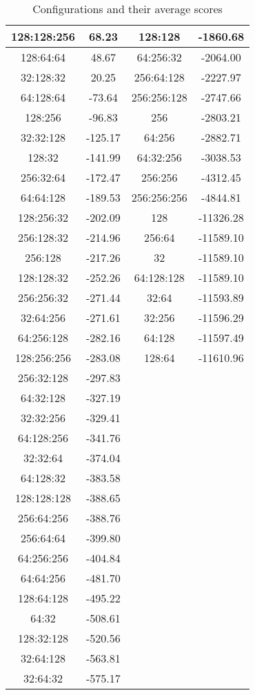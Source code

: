 \begin{table}[h]
\begin{tabular}{|c|c||c|c|}
\hline
128:128:256 & 68.23 & 128:128 & -1860.68 \\
\hline
128:64:64 & 48.67 & 64:256:32 & -2064.00 \\
\hline
32:128:32 & 20.25 & 256:64:128 & -2227.97 \\
\hline
64:128:64 & -73.64 & 256:256:128 & -2747.66 \\
\hline
128:256 & -96.83 & 256 & -2803.21 \\
\hline
32:32:128 & -125.17 & 64:256 & -2882.71 \\
\hline
128:32 & -141.99 & 64:32:256 & -3038.53 \\
\hline
256:32:64 & -172.47 & 256:256 & -4312.45 \\
\hline
64:64:128 & -189.53 & 256:256:256 & -4844.81 \\
\hline
128:256:32 & -202.09 & 128 & -11326.28 \\
\hline
256:128:32 & -214.96 & 256:64 & -11589.10 \\
\hline
256:128 & -217.26 & 32 & -11589.10 \\
\hline
128:128:32 & -252.26 & 64:128:128 & -11589.10 \\
\hline
256:256:32 & -271.44 & 32:64 & -11593.89 \\
\hline
32:64:256 & -271.61 & 32:256 & -11596.29 \\
\hline
64:256:128 & -282.16 & 64:128 & -11597.49 \\
\hline
128:256:256 & -283.08 & 128:64 & -11610.96 \\
\hline
256:32:128 & -297.83 &  &  \\
\hline
64:32:128 & -327.19 &  &  \\
\hline
32:32:256 & -329.41 &  &  \\
\hline
64:128:256 & -341.76 &  &  \\
\hline
32:32:64 & -374.04 &  &  \\
\hline
64:128:32 & -383.58 &  &  \\
\hline
128:128:128 & -388.65 &  &  \\
\hline
256:64:256 & -388.76 &  &  \\
\hline
256:64:64 & -399.80 &  &  \\
\hline
64:256:256 & -404.84 &  &  \\
\hline
64:64:256 & -481.70 &  &  \\
\hline
128:64:128 & -495.22 &  &  \\
\hline
64:32 & -508.61 &  &  \\
\hline
128:32:128 & -520.56 &  &  \\
\hline
32:64:128 & -563.81 &  &  \\
\hline
32:64:32 & -575.17 &  &  \\
\hline
\end{tabular}
\caption{Configurations and their average scores}
\label{tab:config_scores}
\end{table}
